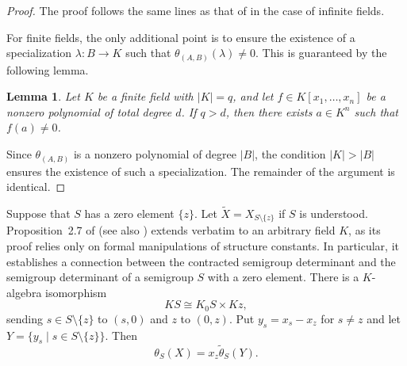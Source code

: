 \documentclass[11pt,reqno]{amsart}
\theoremstyle{plain}
\newtheorem{cor}[thm]{Corollary}
\newtheorem{lem}[thm]{Lemma}
\theoremstyle{remark}
\theoremstyle{definition}
\begin{document}
\begin{proof}
The proof follows the same lines as that of \cite[Theorem~2.1]{Ste-Fac-det} in the case of infinite fields. 

For finite fields, the only additional point is to ensure the existence of a specialization 
$\lambda : B \to K$ such that $\theta_{(A,B)}(\lambda) \neq 0$. 
This is guaranteed by the following lemma.
\begin{lem}\label{OrderKAndx1xn}
Let $K$ be a finite field with $|K| = q$, and let $f \in K[x_1,\dots,x_n]$ be a nonzero polynomial of total degree $d$. 
If $q > d$, then there exists $a \in K^n$ such that $f(a)\neq 0$.
\end{lem}
Since $\theta_{(A,B)}$ is a nonzero polynomial of degree $|B|$, the condition $|K| > |B|$ ensures the existence of such a specialization. 
The remainder of the argument is identical.
\end{proof}


Suppose that $S$ has a zero element $\{z\}$.
Let \( \widetilde{X} = X_{S \setminus \{z\}} \) if \( S \) is understood.  
Proposition~2.7 of \cite{Ste-Fac-det} (see also \cite{Wood}) extends verbatim to an arbitrary field $K$, as its proof relies only on formal manipulations of structure constants.
In particular, it establishes a connection between the contracted semigroup determinant and the semigroup determinant of a semigroup $S$ with a zero element.
There is a $K$-algebra isomorphism
\[
KS \cong K_0S \times K z,
\]
sending $s \in S \setminus \{z\}$ to $(s,0)$ and $z$ to $(0,z)$.
Put \( y_s = x_s - x_z \) for \( s \neq z \) and let \( Y = \{ y_s \mid s \in S \setminus \{z\} \} \).  
Then  
\[
\theta_S(X) = x_z \widetilde{\theta}_S(Y).
\]  




\end{document}
